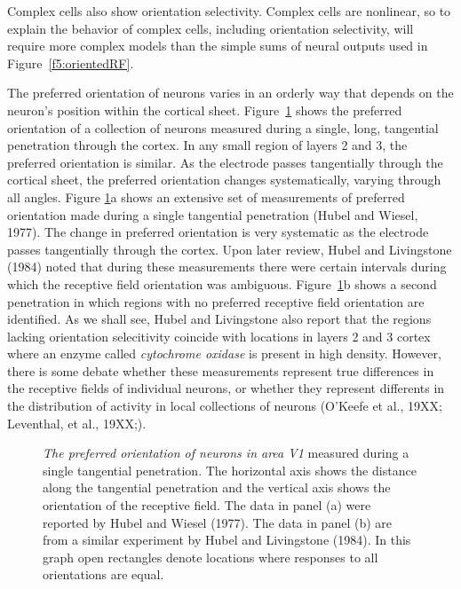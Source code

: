 Complex cells also show orientation selectivity.
Complex cells are nonlinear, so to explain the behavior of
complex cells, including orientation selectivity, will require 
more complex models than the simple sums of neural outputs
used in Figure~\ref{f5:orientedRF}.

The preferred orientation of neurons
varies in an orderly
way that depends on the neuron's position within the cortical sheet.
Figure~\ref{f5:orientation} shows
the preferred orientation of a collection of neurons
measured during a single, long, tangential penetration
through the cortex.
In any small region of layers 2 and 3,
the preferred orientation is similar.
As the electrode passes tangentially through the cortical
sheet, the preferred orientation changes systematically,
varying through all angles.
Figure \ref{f5:orientation}a shows an
extensive set of measurements of preferred orientation
made during a single tangential penetration (Hubel and Wiesel, 1977).
The change in preferred orientation is very systematic as the
electrode passes tangentially through the cortex.
Upon later review, Hubel and Livingstone (1984) noted that
during these measurements there were certain intervals during
which the receptive field orientation was ambiguous.
Figure~\ref{f5:orientation}b shows a second
penetration in which regions with no
preferred receptive field orientation are identified.
As we shall see, Hubel and Livingstone also report that the
regions lacking orientation selecitivity
coincide with locations in layers 2 and 3 cortex where
an enzyme called {\em cytochrome oxidase} is present in high density.
However, there is some debate whether these measurements 
represent true differences in the receptive fields
of individual neurons, or whether they represent 
differents in the distribution of activity
in local collections of neurons 
(O'Keefe et al., 19XX; Leventhal, et al., 19XX;).
\begin{figure}
\centerline {
}
\caption[Orientation Columns in Visual Cortex]{
{\em The preferred orientation of neurons in area V1}
measured during a single tangential penetration.
The horizontal axis shows the distance along the tangential
penetration and the vertical axis shows the orientation
of the receptive field.
The data in panel (a) were reported by Hubel and Wiesel (1977).
The data in panel (b) are from a similar experiment
by Hubel and Livingstone (1984).
In this graph open rectangles denote
locations where responses to all orientations are equal.
}
\label{f5:orientation}
\end{figure}

